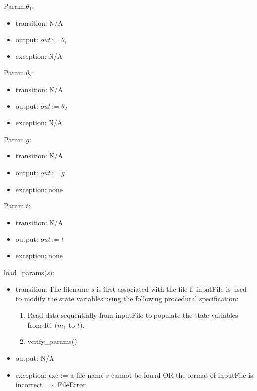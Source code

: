 \documentclass[12pt, titlepage]{article}
\begin{document}
\noindent Param.$\theta_1$:
\begin{itemize}
\item transition: N/A
\item output: $out := \theta_1$
\item exception: N/A
\end{itemize}

\noindent Param.$\theta_2$:
\begin{itemize}
\item transition: N/A
\item output: $out := \theta_2$
\item exception: N/A
\end{itemize}


\noindent Param.$g$:
\begin{itemize}
\item transition: N/A
\item output: $out := g$
\item exception: none
\end{itemize}

\noindent Param.$t$:
\begin{itemize}
\item transition: N/A
\item output: $out := t$
\item exception: none
\end{itemize}

\noindent load\_params($s$):
\begin{itemize}
\item transition: The filename $s$ is first associated with the file f.  {inputFile} is used to
  modify the state variables using the following procedural specification:
\begin{enumerate}
\item Read data sequentially from inputFile to populate the state variables from
  R1 ($m_1$ to $\mathit{t}$).


\item verify\_params()


\end{enumerate}
\item output: N/A
\item exception: exc := a file name $s$ cannot be found OR the format of
  inputFile is incorrect $\Rightarrow$  FileError
\end{itemize}
\end{document}
